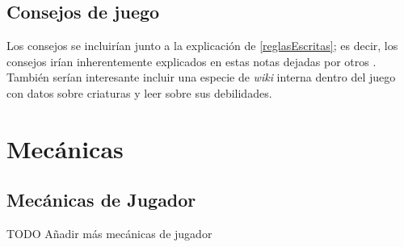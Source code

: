 \begin{multicols}{2}
    \subsection{Consejos de juego}
    Los consejos se incluirían junto a la explicación de \ref{reglasEscritas}; es decir, los consejos irían inherentemente explicados en estas notas dejadas por otros \hunters. También serían interesante incluir una especie de \textit{wiki} interna dentro del juego con datos sobre criaturas y leer sobre sus debilidades.
    \end{multicols}


\section{Mecánicas}

    \subsection{Mecánicas de Jugador}
    TODO Añadir más mecánicas de jugador
